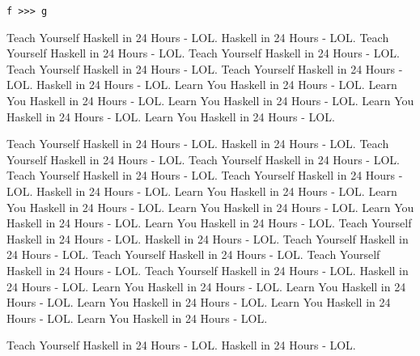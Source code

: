 \begin{verbatim}
f >>> g
\end{verbatim}

Teach Yourself Haskell in 24 Hours - LOL.  Haskell in 24 Hours - LOL. Teach Yourself Haskell in 24 Hours - LOL. Teach Yourself Haskell in 24 Hours - LOL. Teach Yourself Haskell in 24 Hours - LOL. Teach Yourself Haskell in 24 Hours - LOL.  Haskell in 24 Hours - LOL. Learn You Haskell in 24 Hours - LOL. Learn You Haskell in 24 Hours - LOL. Learn You Haskell in 24 Hours - LOL. Learn You Haskell in 24 Hours - LOL. Learn You Haskell in 24 Hours - LOL.

Teach Yourself Haskell in 24 Hours - LOL.  Haskell in 24 Hours - LOL. Teach Yourself Haskell in 24 Hours - LOL. Teach Yourself Haskell in 24 Hours - LOL. Teach Yourself Haskell in 24 Hours - LOL. Teach Yourself Haskell in 24 Hours - LOL.  Haskell in 24 Hours - LOL. Learn You Haskell in 24 Hours - LOL. Learn You Haskell in 24 Hours - LOL. Learn You Haskell in 24 Hours - LOL. Learn You Haskell in 24 Hours - LOL. Learn You Haskell in 24 Hours - LOL.
Teach Yourself Haskell in 24 Hours - LOL.  Haskell in 24 Hours - LOL. Teach Yourself Haskell in 24 Hours - LOL. Teach Yourself Haskell in 24 Hours - LOL. Teach Yourself Haskell in 24 Hours - LOL. Teach Yourself Haskell in 24 Hours - LOL.  Haskell in 24 Hours - LOL. Learn You Haskell in 24 Hours - LOL. Learn You Haskell in 24 Hours - LOL. Learn You Haskell in 24 Hours - LOL. Learn You Haskell in 24 Hours - LOL. Learn You Haskell in 24 Hours - LOL.

Teach Yourself Haskell in 24 Hours - LOL.  Haskell in 24 Hours - LOL.
